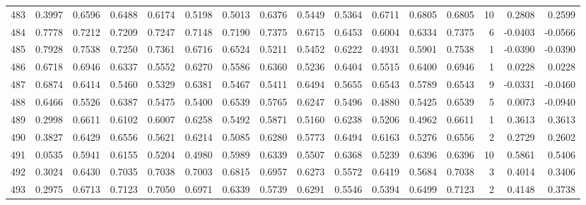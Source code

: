 \begin{tabular}{lrrrrrrrrrrrrrrr}
483 &      0.3997 &  0.6596 &  0.6488 &  0.6174 &  0.5198 &  0.5013 &  0.6376 &  0.5449 &  0.5364 &  0.6711 &   0.6805 &     0.6805 &     10 &                    0.2808 &                     0.2599 \\
484 &      0.7778 &  0.7212 &  0.7209 &  0.7247 &  0.7148 &  0.7190 &  0.7375 &  0.6715 &  0.6453 &  0.6004 &   0.6334 &     0.7375 &      6 &                   -0.0403 &                    -0.0566 \\
485 &      0.7928 &  0.7538 &  0.7250 &  0.7361 &  0.6716 &  0.6524 &  0.5211 &  0.5452 &  0.6222 &  0.4931 &   0.5901 &     0.7538 &      1 &                   -0.0390 &                    -0.0390 \\
486 &      0.6718 &  0.6946 &  0.6337 &  0.5552 &  0.6270 &  0.5586 &  0.6360 &  0.5236 &  0.6404 &  0.5515 &   0.6400 &     0.6946 &      1 &                    0.0228 &                     0.0228 \\
487 &      0.6874 &  0.6414 &  0.5460 &  0.5329 &  0.6381 &  0.5467 &  0.5411 &  0.6494 &  0.5655 &  0.6543 &   0.5789 &     0.6543 &      9 &                   -0.0331 &                    -0.0460 \\
488 &      0.6466 &  0.5526 &  0.6387 &  0.5475 &  0.5400 &  0.6539 &  0.5765 &  0.6247 &  0.5496 &  0.4880 &   0.5425 &     0.6539 &      5 &                    0.0073 &                    -0.0940 \\
489 &      0.2998 &  0.6611 &  0.6102 &  0.6007 &  0.6258 &  0.5492 &  0.5871 &  0.5160 &  0.6238 &  0.5206 &   0.4962 &     0.6611 &      1 &                    0.3613 &                     0.3613 \\
490 &      0.3827 &  0.6429 &  0.6556 &  0.5621 &  0.6214 &  0.5085 &  0.6280 &  0.5773 &  0.6494 &  0.6163 &   0.5276 &     0.6556 &      2 &                    0.2729 &                     0.2602 \\
491 &      0.0535 &  0.5941 &  0.6155 &  0.5204 &  0.4980 &  0.5989 &  0.6339 &  0.5507 &  0.6368 &  0.5239 &   0.6396 &     0.6396 &     10 &                    0.5861 &                     0.5406 \\
492 &      0.3024 &  0.6430 &  0.7035 &  0.7038 &  0.7003 &  0.6815 &  0.6957 &  0.6273 &  0.5572 &  0.6419 &   0.5684 &     0.7038 &      3 &                    0.4014 &                     0.3406 \\
493 &      0.2975 &  0.6713 &  0.7123 &  0.7050 &  0.6971 &  0.6339 &  0.5739 &  0.6291 &  0.5546 &  0.5394 &   0.6499 &     0.7123 &      2 &                    0.4148 &                     0.3738 \\

\end{tabular}
